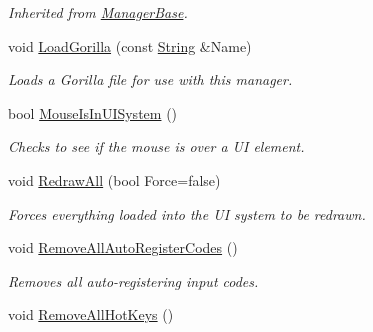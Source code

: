 \begin{DoxyCompactItemize}
\begin{DoxyCompactList}\small\item\em Inherited from \hyperlink{classphys_1_1ManagerBase}{ManagerBase}. \item\end{DoxyCompactList}\item 
void \hyperlink{classphys_1_1UIManager_afda4422105d6ab353fd40410adffbc0a}{LoadGorilla} (const \hyperlink{namespacephys_aa03900411993de7fbfec4789bc1d392e}{String} \&Name)
\begin{DoxyCompactList}\small\item\em Loads a Gorilla file for use with this manager. \item\end{DoxyCompactList}\item 
bool \hyperlink{classphys_1_1UIManager_a38bc8d2ed1930a8ff6e82ef5f991dbe1}{MouseIsInUISystem} ()
\begin{DoxyCompactList}\small\item\em Checks to see if the mouse is over a UI element. \item\end{DoxyCompactList}\item 
void \hyperlink{classphys_1_1UIManager_a4a4ce18dc4f32f8274a50fb4b99b87e3}{RedrawAll} (bool Force=false)
\begin{DoxyCompactList}\small\item\em Forces everything loaded into the UI system to be redrawn. \item\end{DoxyCompactList}\item 
\hypertarget{classphys_1_1UIManager_a006ae9f06562877b0a7fe315c25d96a0}{
void \hyperlink{classphys_1_1UIManager_a006ae9f06562877b0a7fe315c25d96a0}{RemoveAllAutoRegisterCodes} ()}
\label{classphys_1_1UIManager_a006ae9f06562877b0a7fe315c25d96a0}

\begin{DoxyCompactList}\small\item\em Removes all auto-\/registering input codes. \item\end{DoxyCompactList}\item 
\hypertarget{classphys_1_1UIManager_ac09c26ff3d5bade09f0480d5702d2042}{
void \hyperlink{classphys_1_1UIManager_ac09c26ff3d5bade09f0480d5702d2042}{RemoveAllHotKeys} ()}
\label{classphys_1_1UIManager_ac09c26ff3d5bade09f0480d5702d2042}


\end{DoxyCompactItemize}
